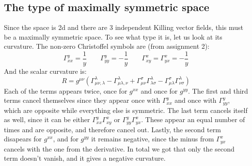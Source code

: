 \documentclass{article}
\begin{document}
\subsection{The type of maximally symmetric space}
Since the space is 2d and there are 3 independent Killing vector fields, this must be a maximally symmetric space. To see what type it is, let us look at its curvature. The non-zero Christoffel symbols are (from assignment 2):
\begin{equation}
    \Gamma^{y}_{xx} = \frac{1}{y}
    \qquad
    \Gamma^{y}_{yy} = -\frac{1}{y}
    \qquad
    \Gamma^{x}_{xy} = \Gamma^{x}_{yx} = -\frac{1}{y}
\end{equation}
And the scalar curvature is:
\begin{equation}
    R = g^{\mu\nu}\left(
        \Gamma^\lambda_{\mu\nu,\lambda} - \Gamma^\lambda_{\mu\lambda,\nu} + \Gamma^{\sigma}_{\mu\nu}\Gamma^{\lambda}_{\lambda\sigma} - \Gamma^{\sigma}_{\mu\lambda}\Gamma^{\lambda}_{\nu\sigma}
    \right)
\end{equation}
Each of the terms appears twice, once for $g^{xx}$ and once for $g^{yy}$. The first and third terms cancel themselves since they appear once with $\Gamma^{y}_{xx}$ and once with $\Gamma^{y}_{yy}$, which are opposite while everything else is symmetric. The last term cancels itself as well, since it can be either $\Gamma^{y}_{xx}\Gamma^{x}_{xy}$ or $\Gamma^{y}_{yy}\Gamma^{x}_{yx}$. These appear an equal number of times and are opposite, and therefore cancel out. Lastly, the second term disapears for $g^{xx}$, and for $g^{yy}$ it remains negative, since the minus from $\Gamma^{x}_{yx}$ cancels with the one from the derivative. In total we got that only the second term doesn't vanish, and it gives a negative curvature.
\end{document}
